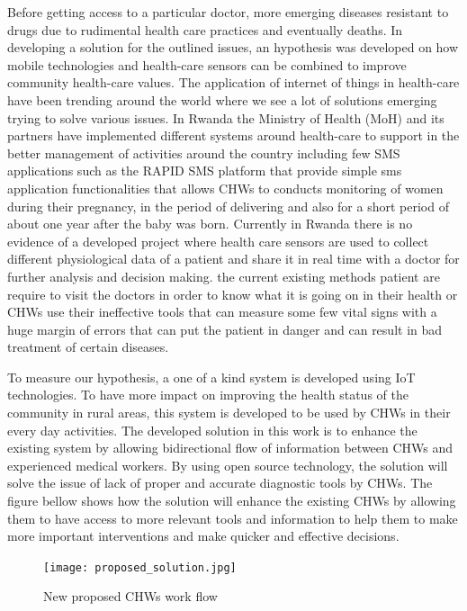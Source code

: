 Before getting access to a particular doctor, more emerging diseases resistant to drugs due to rudimental health care practices and eventually deaths. In developing a solution for the outlined issues, an hypothesis was developed on how mobile technologies and health-care sensors can be combined to improve community health-care values. The application of internet of things in health-care have been trending around the world where we see a lot of solutions emerging trying to solve various issues. In Rwanda the Ministry of Health (MoH) and its partners have implemented different systems around health-care to support in the better management of activities around the country including few SMS applications such as the RAPID SMS platform that provide simple sms application functionalities that allows CHWs to conducts monitoring of women during their pregnancy, in the period of delivering and also for a short period of about one year after the baby was born. Currently in Rwanda there is no evidence of a developed project where health care sensors are used to collect different physiological data of a patient and share it in real time with a doctor for further analysis and decision making. the current existing methods patient are require to visit the doctors in order to know what it is going on in their health or CHWs use their ineffective tools that can measure some few vital signs with a huge margin of errors that can put the patient in danger and can result in bad treatment of certain diseases.

To measure our hypothesis, a one of a kind system is developed using IoT technologies. To have more impact on improving the health status of the community in rural areas, this system is developed to be used by CHWs in their every day activities. The developed solution in this work is to enhance the existing system by allowing bidirectional flow of information between CHWs and experienced medical workers. By using open source technology, the solution will solve the issue of lack of proper and accurate diagnostic tools by CHWs. The figure bellow shows how the solution will enhance the existing CHWs by allowing them to have access to more relevant tools and information to help them to make more important interventions and make quicker and effective decisions.

\begin{figure}[H]
\centering
\texttt{[image: proposed\_solution.jpg]} %
\caption{New proposed CHWs work flow}
\label{fig:fig-eg}  
\end{figure}
